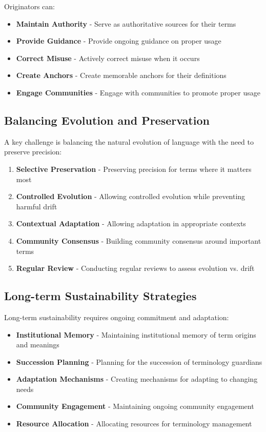 \documentclass[11pt]{article}
\begin{document}
Originators can:

\begin{itemize}
\item \textbf{Maintain Authority} - Serve as authoritative sources for their terms
\item \textbf{Provide Guidance} - Provide ongoing guidance on proper usage
\item \textbf{Correct Misuse} - Actively correct misuse when it occurs
\item \textbf{Create Anchors} - Create memorable anchors for their definitions
\item \textbf{Engage Communities} - Engage with communities to promote proper usage
\end{itemize}

\subsection{Balancing Evolution and Preservation}

A key challenge is balancing the natural evolution of language with the need to preserve precision:

\begin{enumerate}
\item \textbf{Selective Preservation} - Preserving precision for terms where it matters most
\item \textbf{Controlled Evolution} - Allowing controlled evolution while preventing harmful drift
\item \textbf{Contextual Adaptation} - Allowing adaptation in appropriate contexts
\item \textbf{Community Consensus} - Building community consensus around important terms
\item \textbf{Regular Review} - Conducting regular reviews to assess evolution vs. drift
\end{enumerate}

\subsection{Long-term Sustainability Strategies}

Long-term sustainability requires ongoing commitment and adaptation:

\begin{itemize}
\item \textbf{Institutional Memory} - Maintaining institutional memory of term origins and meanings
\item \textbf{Succession Planning} - Planning for the succession of terminology guardians
\item \textbf{Adaptation Mechanisms} - Creating mechanisms for adapting to changing needs
\item \textbf{Community Engagement} - Maintaining ongoing community engagement
\item \textbf{Resource Allocation} - Allocating resources for terminology management
\end{itemize}
\end{document}
